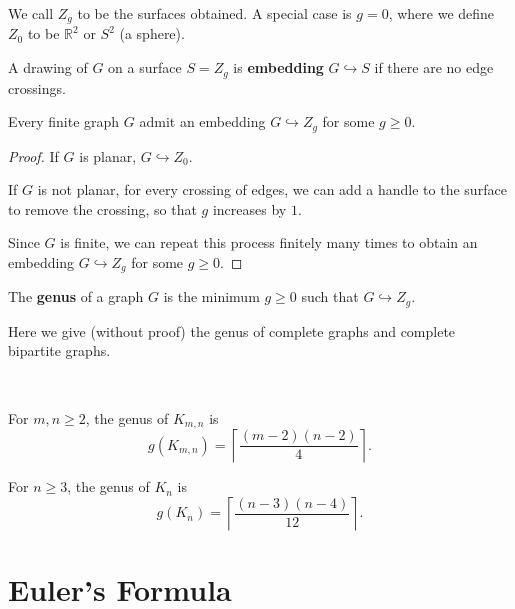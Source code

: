 We call $Z_g$ to be the surfaces obtained. A special case is $g=0$, where we define $Z_0$ to be $\mathbb R^2$ or $S^2$ (a sphere).

\begin{definition}[Embedding]
	A drawing of $G$ on a surface $S=Z_g$ is \textbf{embedding} $G\hookrightarrow S$ if there are no edge crossings.
\end{definition}

\begin{proposition}
	Every finite graph $G$ admit an embedding $G\hookrightarrow Z_g$ for some $g\ge 0$.
\end{proposition}

\begin{proof}
	If $G$ is planar, $G\hookrightarrow Z_0$.

	If $G$ is not planar, for every crossing of edges, we can add a handle to the surface to remove the crossing, so that $g$ increases by $1$.

	Since $G$ is finite, we can repeat this process finitely many times to obtain an embedding $G\hookrightarrow Z_g$ for some $g\ge 0$.
\end{proof}

\begin{definition}[Genus]
	The \textbf{genus} of a graph $G$ is the minimum $g\ge 0$ such that $G\hookrightarrow Z_g$.
\end{definition}

Here we give (without proof) the genus of complete graphs and complete bipartite graphs.

\begin{theorem}
	$ $

	For $m,n\ge 2$, the genus of $K_{m,n}$ is
	\[
		g(K_{m,n}) = \left\lceil \frac{(m-2)(n-2)}{4} \right\rceil.
	\]

	For $n\ge 3$, the genus of $K_n$ is
	\[
		g(K_n) = \left\lceil \frac{(n-3)(n-4)}{12} \right\rceil.
	\]
\end{theorem}

\section{Euler's Formula}

